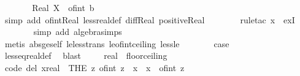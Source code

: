 \begin{isabellebody}
\ \ \ \ \isamarkupfalse%
\ \isamarkupfalse%
\ {\isachardoublequoteopen}Real\ X\ {\isacharless}{\kern0pt}\ of{\isacharunderscore}{\kern0pt}int\ {\isacharparenleft}{\kern0pt}{\isasymlceil}b{\isasymrceil}\ {\isacharplus}{\kern0pt}\ {}{\isacharparenright}{\kern0pt}{\isachardoublequoteclose}\isanewline
\ \ \ \ \ \ \isamarkupfalse%
\ {}\isanewline
\ \ \ \ \ \ \isamarkupfalse%
\ {\isacharparenleft}{\kern0pt}simp\ add{\isacharcolon}{\kern0pt}\ of{\isacharunderscore}{\kern0pt}int{\isacharunderscore}{\kern0pt}Real\ less{\isacharunderscore}{\kern0pt}real{\isacharunderscore}{\kern0pt}def\ diff{\isacharunderscore}{\kern0pt}Real\ positive{\isacharunderscore}{\kern0pt}Real{\isacharparenright}{\kern0pt}\isanewline
\ \ \ \ \ \ \isamarkupfalse%
\ {\isacharparenleft}{\kern0pt}rule{\isacharunderscore}{\kern0pt}tac\ x{\isacharequal}{\kern0pt}{}\ \ exI{\isacharparenright}{\kern0pt}\isanewline
\ \ \ \ \ \ \isamarkupfalse%
\ {\isacharparenleft}{\kern0pt}simp\ add{\isacharcolon}{\kern0pt}\ algebra{\isacharunderscore}{\kern0pt}simps{\isacharparenright}{\kern0pt}\isanewline
\ \ \ \ \ \ \isamarkupfalse%
\ {\isacharparenleft}{\kern0pt}metis\ abs{\isacharunderscore}{\kern0pt}ge{\isacharunderscore}{\kern0pt}self\ le{\isacharunderscore}{\kern0pt}less{\isacharunderscore}{\kern0pt}trans\ le{\isacharunderscore}{\kern0pt}of{\isacharunderscore}{\kern0pt}int{\isacharunderscore}{\kern0pt}ceiling\ less{\isacharunderscore}{\kern0pt}le{\isacharparenright}{\kern0pt}\isanewline
\ \ \ \ \isamarkupfalse%
\ \isamarkupfalse%
\ {\isacharquery}{\kern0pt}case\isanewline
\ \ \ \ \ \ \isamarkupfalse%
\ less{\isacharunderscore}{\kern0pt}eq{\isacharunderscore}{\kern0pt}real{\isacharunderscore}{\kern0pt}def\ \isamarkupfalse%
\ blast\ \isanewline
\ \ \isamarkupfalse%
\isanewline
{}\isamarkupfalse%
%
\endisatagproof
{\isafoldproof}%
%
\isadelimproof
\isanewline
%
\endisadelimproof
\isanewline
{}\isamarkupfalse%
\ real\ {\isacharcolon}{\kern0pt}{\isacharcolon}{\kern0pt}\ floor{\isacharunderscore}{\kern0pt}ceiling\isanewline
{}\isanewline
\isanewline
{}\isamarkupfalse%
\ {\isacharbrackleft}{\kern0pt}code\ del{\isacharbrackright}{\kern0pt}{\isacharcolon}{\kern0pt}\ {\isachardoublequoteopen}{\isasymlfloor}x{\isacharcolon}{\kern0pt}{\isacharcolon}{\kern0pt}real{\isasymrfloor}\ {\isacharequal}{\kern0pt}\ {\isacharparenleft}{\kern0pt}THE\ z{\isachardot}{\kern0pt}\ of{\isacharunderscore}{\kern0pt}int\ z\ {\isasymle}\ x\ {\isasymand}\ x\ {\isacharless}{\kern0pt}\ of{\isacharunderscore}{\kern0pt}int\ {\isacharparenleft}{\kern0pt}z\ {\isacharplus}{\kern0pt}\ {}{\isacharparenright}{\kern0pt}{\isacharparenright}{\kern0pt}{\isachardoublequoteclose}\isanewline

\end{isabellebody}
